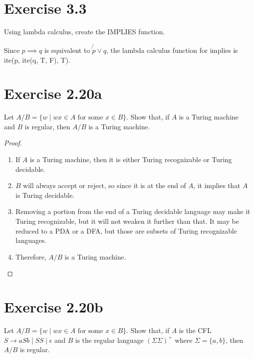 \documentclass{article}
\newcommand{\where}{\mid}
\begin{document}
\section{Exercise 3.3}

Using lambda calculus, create the IMPLIES function.

Since $p \implies q$ is equivalent to $\not{p} \vee q$, the lambda calculus
function for implies is ite(p, ite(q, T, F), T).

\section{Exercise 2.20a}

Let $A/B = \{ w \where wx \in A \text{ for some } x \in B \}$. Show that, if $A$
is a Turing machine and $B$ is regular, then $A/B$ is a Turing machine.

\begin{proof}
	\mbox{}
	\begin{enumerate}
	  \item If $A$ is a Turing machine, then it is either Turing recognizable or
	  Turing decidable. 
	  \item $B$ will always accept or reject, so since it is at the end of $A$, it
	  implies that $A$ is Turing decidable.
	  \item Removing a portion from the end of a Turing decidable language may make
	  it Turing recognizable, but it will not weaken it further than that. It may
	  be reduced to a PDA or a DFA, but those are subsets of Turing recognizable
	  languages.
	  \item Therefore, $A/B$ is a Turing machine. \qedhere
	\end{enumerate}
\end{proof}

\section{Exercise 2.20b}

Let $A/B = \{ w \where wx \in A \text{ for some } x \in B \}$. Show that, if $A$
is the CFL $S \rightarrow aSb \mid SS \mid \epsilon$ and $B$ is the regular language
$(\Sigma \Sigma)^+$ where $\Sigma = \{a, b\}$, then $A/B$ is regular.
\end{document}
